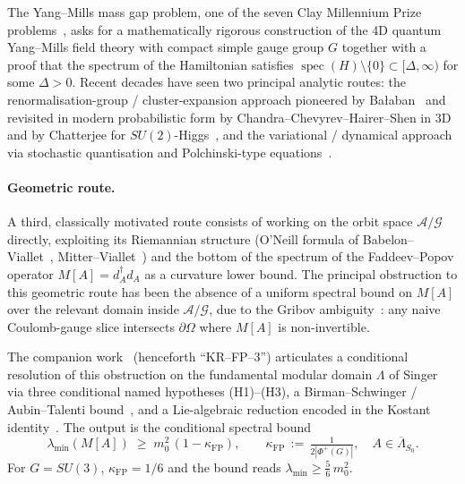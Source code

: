 \documentclass[11pt,a4paper]{amsart}
\theoremstyle{definition}
\DeclareMathOperator{\spec}{spec}
\newcommand{\kFP}{\kappa_{\mathrm{FP}}}
\begin{document}
The Yang--Mills mass gap problem, one of the seven Clay Millennium Prize
problems~\cite{JaffeWitten2000}, asks for a mathematically rigorous
construction of the 4D quantum Yang--Mills field theory with compact simple
gauge group $G$ together with a proof that the spectrum of the Hamiltonian
satisfies $\spec(H)\setminus\{0\}\subset[\Delta,\infty)$ for some
$\Delta>0$. Recent decades have seen two principal analytic routes:
the renormalisation-group / cluster-expansion approach pioneered by
Ba\l aban~\cite{Balaban1985} and revisited in modern probabilistic form
by Chandra--Chevyrev--Hairer--Shen in
3D~\cite{ChandraChevyrevHairerShen2024} and by Chatterjee for
$SU(2)$-Higgs~\cite{Chatterjee2024}, and the variational / dynamical
approach via stochastic quantisation and Polchinski-type
equations~\cite{BauerschmidtBodineauDagallier2024,BauerschmidtDagallier2024,
CaoParkSheffield2024,CaoNissimSheffield2025}.

\paragraph{Geometric route.} A third, classically motivated route consists of
working on the orbit space $\mathcal A/\mathcal G$ directly, exploiting its
Riemannian structure (O'Neill formula of
Babelon--Viallet~\cite{BabelonViallet1981}, Mitter--Viallet~\cite{MitterViallet1981})
and the bottom of the spectrum of the Faddeev--Popov operator
$M[A] = d_A^\dagger d_A$ as a curvature lower bound. The principal obstruction
to this geometric route has been the absence of a uniform spectral bound on
$M[A]$ over the relevant domain inside $\mathcal A/\mathcal G$, due to the
Gribov ambiguity~\cite{Gribov1978}: any naive Coulomb-gauge slice intersects
$\partial\Omega$ where $M[A]$ is non-invertible.

The companion work~\cite{RemondiereKRFP3_2026} (henceforth ``KR--FP--3'')
articulates a conditional resolution of this obstruction on the fundamental
modular domain $\Lambda$ of Singer~\cite{Singer1978} via three conditional
named hypotheses (H1)--(H3), a Birman--Schwinger / Aubin--Talenti
bound~\cite{Aubin1976,Talenti1976}, and a Lie-algebraic reduction encoded
in the Kostant identity~\cite{Kostant1959}. The output is the conditional
spectral bound
\begin{equation}\label{eq:KRFP3-bound}
\lambda_{\min}(M[A]) \;\geq\; m_0^2\,(1-\kFP), \qquad
\kFP \,:=\, \tfrac{1}{2|\Phi^+(G)|},
\quad A \in \overline\Lambda_{S_0}.
\end{equation}
For $G = SU(3)$, $\kFP = 1/6$ and the bound reads
$\lambda_{\min} \geq \tfrac{5}{6}\, m_0^2$.
\end{document}
